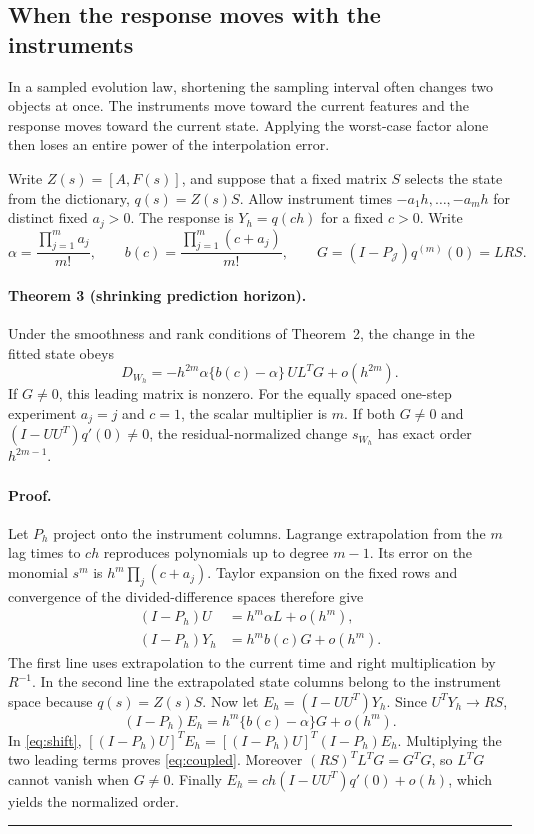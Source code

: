 \subsection{When the response moves with the instruments}
In a sampled evolution law, shortening the sampling interval often changes two objects at once. The instruments move toward the current features and the response moves toward the current state. Applying the worst-case factor alone then loses an entire power of the interpolation error.

Write $Z(s)=[A,F(s)]$, and suppose that a fixed matrix $S$ selects the state from the dictionary, $q(s)=Z(s)S$. Allow instrument times $-a_1h,\ldots,-a_mh$ for distinct fixed $a_j>0$. The response is $Y_h=q(ch)$ for a fixed $c>0$. Write
\[
 \alpha=\frac{\prod_{j=1}^m a_j}{m!},\qquad
 b(c)=\frac{\prod_{j=1}^m(c+a_j)}{m!},\qquad
 G=(I-P_{\mathcal J})q^{(m)}(0)=LRS .
\]

\paragraph{Theorem 3 (shrinking prediction horizon).}
Under the smoothness and rank conditions of Theorem~2, the change in the fitted state obeys
\begin{equation}
 D_{W_h}=-h^{2m}\alpha\{b(c)-\alpha\}\,U L^T G+o(h^{2m}). \label{eq:coupled}
\end{equation}
If $G\ne0$, this leading matrix is nonzero. For the equally spaced one-step experiment $a_j=j$ and $c=1$, the scalar multiplier is $m$. If both $G\ne0$ and $(I-UU^T)q'(0)\ne0$, the residual-normalized change $s_{W_h}$ has exact order $h^{2m-1}$.

\paragraph{Proof.}
Let $P_h$ project onto the instrument columns. Lagrange extrapolation from the $m$ lag times to $ch$ reproduces polynomials up to degree $m-1$. Its error on the monomial $s^m$ is $h^m\prod_j(c+a_j)$. Taylor expansion on the fixed rows and convergence of the divided-difference spaces therefore give
\begin{align*}
 (I-P_h)U &= h^m\alpha L+o(h^m),\\
 (I-P_h)Y_h &= h^m b(c) G+o(h^m).
\end{align*}
The first line uses extrapolation to the current time and right multiplication by $R^{-1}$. In the second line the extrapolated state columns belong to the instrument space because $q(s)=Z(s)S$. Now let $E_h=(I-UU^T)Y_h$. Since $U^T Y_h\to RS$,
\[
 (I-P_h)E_h=h^m\{b(c)-\alpha\}G+o(h^m).
\]
In \eqref{eq:shift}, $[(I-P_h)U]^T E_h=[(I-P_h)U]^T(I-P_h)E_h$. Multiplying the two leading terms proves \eqref{eq:coupled}. Moreover $(RS)^TL^TG=G^TG$, so $L^TG$ cannot vanish when $G\ne0$. Finally $E_h=ch(I-UU^T)q'(0)+o(h)$, which yields the normalized order. \hfill\rule{1ex}{1ex}

